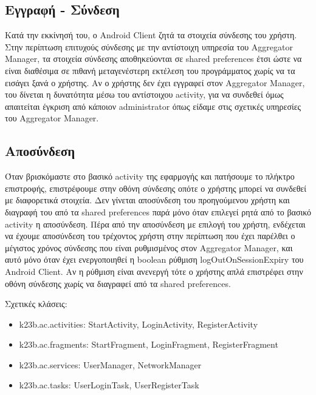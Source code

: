 \documentclass[a4paper,11pt]{article}
\begin{document}
\begin{sloppypar}
\subsection{Εγγραφή - Σύνδεση}

Κατά την εκκίνησή του, ο Android Client ζητά τα στοιχεία σύνδεσης του χρήστη. Στην περίπτωση επιτυχούς σύνδεσης με την αντίστοιχη υπηρεσία του Aggregator Manager, τα στοιχεία σύνδεσης αποθηκεύονται σε shared preferences έτσι ώστε να είναι διαθέσιμα σε πιθανή μεταγενέστερη εκτέλεση του προγράμματος χωρίς να τα εισάγει ξανά ο χρήστης. Αν ο χρήστης δεν έχει εγγραφεί στον Aggregator Manager, του δίνεται η δυνατότητα μέσω του αντίστοιχου activity, για να συνδεθεί όμως απαιτείται έγκριση από κάποιον administrator όπως είδαμε στις σχετικές υπηρεσίες του Aggregator Manager.

\subsection{Αποσύνδεση}

Όταν βρισκόμαστε στο βασικό activity της εφαρμογής και πατήσουμε το πλήκτρο επιστροφής, επιστρέφουμε στην οθόνη σύνδεσης οπότε ο χρήστης μπορεί να συνδεθεί με διαφορετικά στοιχεία. Δεν γίνεται αποσύνδεση του προηγούμενου χρήστη και διαγραφή του από τα shared preferences παρά μόνο όταν επιλεγεί ρητά από το βασικό activity η αποσύνδεση. Πέρα από την αποσύνδεση με επιλογή του χρήστη, ενδέχεται να έχουμε αποσύνδεση του τρέχοντος χρήστη στην περίπτωση που έχει παρέλθει ο μέγιστος χρόνος σύνδεσης που είναι ρυθμισμένος στον Aggregator Manager, και αυτό μόνο όταν έχει ενεργοποιηθεί η boolean ρύθμιση logOutOnSessionExpiry του Android Client. Αν η ρύθμιση είναι ανενεργή τότε ο χρήστης απλά επιστρέφει στην οθόνη σύνδεσης χωρίς να διαγραφεί από τα shared preferences.
\newline

Σχετικές κλάσεις:

\begin{itemize}

\item k23b.ac.activities: StartActivity, LoginActivity, RegisterActivity

\item k23b.ac.fragments: StartFragment, LoginFragment, RegisterFragment

\item k23b.ac.services: UserManager, NetworkManager

\item k23b.ac.tasks: UserLoginTask, UserRegisterTask


\end{itemize}
\end{sloppypar}
\end{document}
